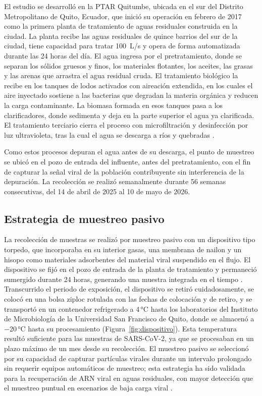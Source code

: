 El estudio se desarrolló en la PTAR Quitumbe, ubicada en el sur del Distrito Metropolitano de Quito, Ecuador, que inició su operación en febrero de 2017 como la primera planta de tratamiento de aguas residuales construida en la ciudad. La planta recibe las aguas residuales de quince barrios del sur de la ciudad, tiene capacidad para tratar 100~L/s y opera de forma automatizada durante las 24 horas del día. El agua ingresa por el pretratamiento, donde se separan los sólidos gruesos y finos, los materiales flotantes, los aceites, las grasas y las arenas que arrastra el agua residual cruda. El tratamiento biológico la recibe en los tanques de lodos activados con aireación extendida, en los cuales el aire inyectado sostiene a las bacterias que degradan la materia orgánica y reducen la carga contaminante. La biomasa formada en esos tanques pasa a los clarificadores, donde sedimenta y deja en la parte superior el agua ya clarificada. El tratamiento terciario cierra el proceso con microfiltración y desinfección por luz ultravioleta, tras la cual el agua se descarga a ríos y quebradas \cite{EPMAPS_2017,Merino_2024}.

Como estos procesos depuran el agua antes de su descarga, el punto de muestreo se ubicó en el pozo de entrada del influente, antes del pretratamiento, con el fin de capturar la señal viral de la población contribuyente sin interferencia de la depuración. La recolección se realizó semanalmente durante 56 semanas consecutivas, del 14 de abril de 2025 al 10 de mayo de 2026.

\subsection{Estrategia de muestreo pasivo}

La recolección de muestras se realizó por muestreo pasivo con un dispositivo tipo torpedo, que incorporaba en su interior gasas, una membrana de nailon y un hisopo como materiales adsorbentes del material viral suspendido en el flujo. El dispositivo se fijó en el pozo de entrada de la planta de tratamiento y permaneció sumergido durante 24 horas, generando una muestra integrada en el tiempo \cite{MejiaCalle_2024}. Transcurrido el periodo de exposición, el dispositivo se retiró cuidadosamente, se colocó en una bolsa ziploc rotulada con las fechas de colocación y de retiro, y se transportó en un contenedor refrigerado a 4\,°C hasta los laboratorios del Instituto de Microbiología de la Universidad San Francisco de Quito, donde se almacenó a −20\,°C hasta su procesamiento (Figura~\ref{fig:dispositivo}). Esta temperatura resultó suficiente para las muestras de SARS-CoV-2, ya que se procesaban en un plazo máximo de un mes desde su recolección. El muestreo pasivo se seleccionó por su capacidad de capturar partículas virales durante un intervalo prolongado sin requerir equipos automáticos de muestreo; esta estrategia ha sido validada para la recuperación de ARN viral en aguas residuales, con mayor detección que el muestreo puntual en escenarios de baja carga viral \cite{Schang_2021}.

